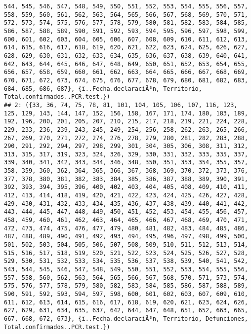 \documentclass[
]{book}
\begin{document}
\begin{verbatim}
544, 545, 546, 547, 548, 549, 550, 551, 552, 553, 554, 555, 556, 557, 558, 559, 560, 561, 562, 563, 564, 565, 566, 567, 568, 569, 570, 571, 572, 573, 574, 575, 576, 577, 578, 579, 580, 581, 582, 583, 584, 585, 586, 587, 588, 589, 590, 591, 592, 593, 594, 595, 596, 597, 598, 599, 600, 601, 602, 603, 604, 605, 606, 607, 608, 609, 610, 611, 612, 613, 614, 615, 616, 617, 618, 619, 620, 621, 622, 623, 624, 625, 626, 627, 628, 629, 630, 631, 632, 633, 634, 635, 636, 637, 638, 639, 640, 641, 642, 643, 644, 645, 646, 647, 648, 649, 650, 651, 652, 653, 654, 655, 656, 657, 658, 659, 660, 661, 662, 663, 664, 665, 666, 667, 668, 669, 670, 671, 672, 673, 674, 675, 676, 677, 678, 679, 680, 681, 682, 683, 684, 685, 686, 687}, {ï..Fecha.declaraciÃ³n, Territorio, Total.confirmados..PCR.test.})
## 2: ({33, 36, 74, 75, 78, 81, 101, 104, 105, 106, 107, 116, 123, 125, 129, 143, 144, 147, 152, 156, 158, 167, 171, 174, 180, 183, 189, 192, 196, 200, 201, 205, 207, 210, 215, 217, 218, 219, 221, 224, 228, 229, 233, 236, 239, 243, 245, 249, 254, 256, 258, 262, 263, 265, 266, 267, 269, 270, 271, 272, 274, 276, 278, 279, 280, 281, 282, 283, 288, 290, 291, 292, 294, 297, 298, 299, 301, 304, 305, 306, 308, 311, 312, 313, 315, 317, 319, 323, 324, 326, 329, 330, 331, 332, 333, 335, 337, 339, 340, 341, 342, 343, 344, 346, 348, 350, 351, 353, 354, 355, 357, 358, 359, 360, 362, 364, 365, 366, 367, 368, 369, 370, 372, 373, 376, 377, 378, 380, 381, 382, 383, 384, 385, 386, 387, 388, 389, 390, 391, 392, 393, 394, 395, 396, 400, 402, 403, 404, 405, 408, 409, 410, 411, 412, 413, 414, 418, 419, 420, 421, 422, 423, 424, 425, 426, 427, 428, 429, 430, 431, 432, 433, 434, 435, 436, 437, 438, 439, 440, 441, 442, 443, 444, 445, 447, 448, 449, 450, 451, 452, 453, 454, 455, 456, 457, 458, 459, 460, 461, 462, 463, 464, 465, 466, 467, 468, 469, 470, 471, 472, 473, 474, 475, 476, 477, 479, 480, 481, 482, 483, 484, 485, 486, 487, 488, 489, 490, 491, 492, 493, 494, 495, 496, 497, 498, 499, 500, 501, 502, 503, 504, 505, 506, 507, 508, 509, 510, 511, 512, 513, 514, 515, 516, 517, 518, 519, 520, 521, 522, 523, 524, 525, 526, 527, 528, 529, 530, 531, 532, 533, 534, 535, 536, 537, 538, 539, 540, 541, 542, 543, 544, 545, 546, 547, 548, 549, 550, 551, 552, 553, 554, 555, 556, 557, 558, 560, 562, 563, 564, 565, 566, 567, 568, 570, 571, 573, 574, 575, 576, 577, 578, 579, 580, 582, 583, 584, 585, 586, 587, 588, 589, 590, 591, 592, 593, 594, 597, 598, 600, 601, 602, 603, 607, 609, 610, 611, 612, 613, 614, 615, 616, 617, 618, 619, 620, 621, 623, 624, 626, 627, 629, 631, 634, 635, 637, 642, 644, 647, 648, 651, 652, 663, 665, 667, 668, 672, 673}, {ï..Fecha.declaraciÃ³n, Territorio, Defunciones, Total.confirmados..PCR.test.})

\end{verbatim}
\end{document}
